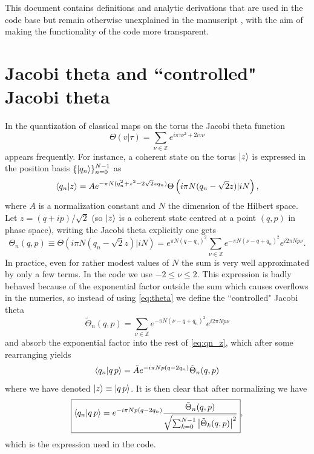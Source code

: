\documentclass[12pt]{article}
\newcommand{\qp}{q\,p}
\begin{document}
This document contains definitions and analytic derivations that are used in the code base but remain otherwise unexplained in the manuscript \cite{scialchi2026quantumtoclassicalcorrespondencekrylovcomplexity},
with the aim of making the functionality of the code more transparent.

\section{Jacobi theta and ``controlled" Jacobi theta}
In the quantization of classical maps on the torus the Jacobi theta function
$$
\Theta(v|\tau) = \sum_{\nu\in\mathbb{Z}} e^{i\pi\tau \nu^2 + 2iv \nu}
$$
appears frequently.
For instance, a coherent state on the torus $\ket{z}$ is expressed in the position basis $\{\ket{q_n}\}_{n=0}^{N-1}$ as \cite{PLeboeuf_1990}
\begin{equation}
    \braket{q_n}{z} = A e^{-\pi N (q_n^2 + z^2 - 2\sqrt{2} z q_n)}
    \Theta\left(i\pi N (q_n - \sqrt{2}z) | i N\right),
    \label{eq:qn_z}
\end{equation}
where $A$ is a normalization constant and $N$ the dimension of the Hilbert space.
Let $z = (q + ip)/\sqrt{2}$ (so $\ket{z}$ is a coherent state centred at a point $(q,p)$ in phase space),
writing the Jacobi theta explicitly one gets
\begin{equation}
    \Theta_n(q, p) \equiv \Theta\left(i\pi N (q_n - \sqrt{2}z) | i N\right) =
    e^{\pi N (q - q_n)^2} \sum_{\nu\in\mathbb{Z}} e^{-\pi N (\nu - q + q_n)^2} e^{i 2\pi N p \nu}.
    \label{eq:theta}
\end{equation}
In practice, even for rather modest values of $N$ the sum is very well approximated by only a few terms.
In the code we use $-2 \leq \nu \leq 2$.
This expression is badly behaved because of the exponential factor outside the sum which causes overflows in the numerics,
so instead of using \eqref{eq:theta} we define the ``controlled" Jacobi theta
\begin{equation}
\boxed{
    \tilde{\Theta}_n(q, p) =
    \sum_{\nu\in\mathbb{Z}} e^{-\pi N (\nu - q + q_n)^2} e^{i 2\pi N p \nu}
}
    \label{eq:controlled_theta}
\end{equation}
and absorb the exponential factor into the rest of \eqref{eq:qn_z},
which after some rearranging yields
$$
    \braket{q_n}{\qp} = \tilde{A} e^{-i\pi N p (q - 2 q_n)} \tilde{\Theta}_n(q, p)
$$
where we have denoted $\ket{z} \equiv \ket{\qp}$.
It is then clear that after normalizing we have
\begin{equation}
    \boxed{
    \braket{q_n}{\qp} = e^{-i\pi N p (q - 2 q_n)}
    \frac{\tilde{\Theta}_n(q, p)}{\sqrt{\sum_{k=0}^{N-1} \abs{\tilde{\Theta}_k(q, p)}^2 }}
}
    \label{eq:controlled_qn_z},
\end{equation}
which is the expression used in the code.
\end{document}
